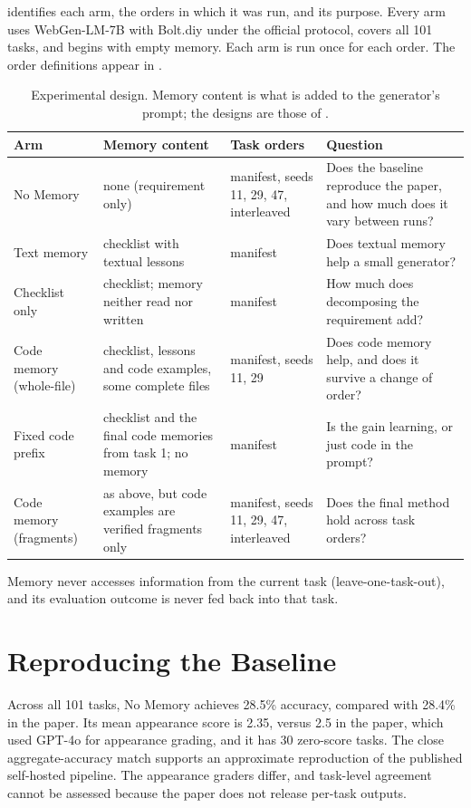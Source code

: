  identifies each arm, the orders in which it was run, and its purpose. Every arm uses WebGen-LM-7B with Bolt.diy under the official protocol, covers all 101 tasks, and begins with empty memory. Each arm is run once for each order. The order definitions appear in .

\begin{table}[ht]
\centering
\caption{Experimental design. Memory content is what is added to the generator's prompt; the designs are those of .}
\label{tab:design}
\small
\begin{tabularx}{\textwidth}{>{\raggedright\arraybackslash}p{2.9cm}X>{\raggedright\arraybackslash}p{2.6cm}>{\raggedright\arraybackslash}X}
\toprule
Arm & Memory content & Task orders & Question \\
\midrule
No Memory & none (requirement only) & manifest, seeds 11, 29, 47, interleaved & Does the baseline reproduce the paper, and how much does it vary between runs? \\
Text memory & checklist with textual lessons & manifest & Does textual memory help a small generator? \\
Checklist only & checklist; memory neither read nor written & manifest & How much does decomposing the requirement add? \\
Code memory (whole-file) & checklist, lessons and code examples, some complete files & manifest, seeds 11, 29 & Does code memory help, and does it survive a change of order? \\
Fixed code prefix & checklist and the final code memories from task 1; no memory & manifest & Is the gain learning, or just code in the prompt? \\
Code memory (fragments) & as above, but code examples are verified fragments only & manifest, seeds 11, 29, 47, interleaved & Does the final method hold across task orders? \\
\bottomrule
\end{tabularx}
\end{table}

Memory never accesses information from the current task (leave-one-task-out), and its evaluation outcome is never fed back into that task.

\section{Reproducing the Baseline}
\label{sec:baseline-repro}
Across all 101 tasks, No Memory achieves 28.5\% accuracy, compared with 28.4\% in the paper. Its mean appearance score is 2.35, versus 2.5 in the paper, which used GPT-4o for appearance grading, and it has 30 zero-score tasks. The close aggregate-accuracy match supports an approximate reproduction of the published self-hosted pipeline. The appearance graders differ, and task-level agreement cannot be assessed because the paper does not release per-task outputs.

